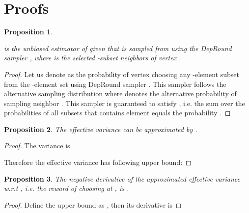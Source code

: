 \documentclass{article}
\newtheorem{proposition}{Proposition}
\begin{document}
\section{Proofs}\label{appendix:proof}
\setcounter{theorem}{0}
\setcounter{property}{0}
\setcounter{proposition}{0}

\begin{proposition}\label{proposition:estimator2}
 
is the unbiased estimator of  
given that  is sampled from  using the DepRound 
sampler , where  is 
the selected -subset neighbors of vertex .
\end{proposition}
\begin{proof}
Let us denote  as the probability of vertex 
 choosing any -element subset  
from the -element set  using DepRound sampler .
This sampler follows the alternative sampling distribution
 where  denotes
the alternative probability of sampling neighbor .
This sampler is guaranteed to satisfy , i.e. the sum over the probabilities of all subsets  that
contains element  equals the probability .

\end{proof}

\begin{proposition}\label{proposition:mp_var_bound}
The effective variance can be approximated by .
\end{proposition}
\begin{proof}
The variance is


Therefore the effective variance has following upper bound:

\end{proof}


\begin{proposition}\label{proposition:mp_derivative}
The negative derivative of the approximated effective variance  w.r.t ,
i.e. the reward of  choosing  at , is
.
\end{proposition}
\begin{proof}
Define the upper bound as ,
then its derivative is 

\end{proof}
\end{document}
